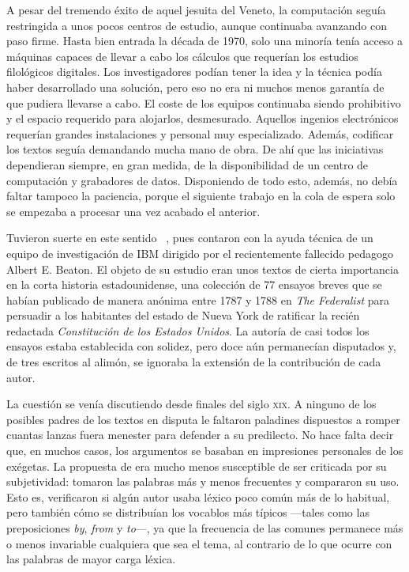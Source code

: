 A pesar del tremendo éxito de aquel jesuita del Veneto, la computación seguía restringida a unos pocos centros de estudio, aunque continuaba avanzando con paso firme. Hasta bien entrada la década de 1970, solo una minoría tenía acceso a máquinas capaces de llevar a cabo los cálculos que requerían los estudios filológicos digitales. Los investigadores podían tener la idea y la técnica podía haber desarrollado una solución, pero eso no era ni muchos menos garantía de que pudiera llevarse a cabo. El coste de los equipos continuaba siendo prohibitivo y el espacio requerido para alojarlos, desmesurado. Aquellos ingenios electrónicos requerían grandes instalaciones y personal muy especializado. Además, codificar los textos seguía demandando mucha mano de obra. De ahí que las iniciativas dependieran siempre, en gran medida, de la disponibilidad de un centro de computación y grabadores de datos. Disponiendo de todo esto, además, no debía faltar tampoco la paciencia, porque el siguiente trabajo en la cola de espera solo se empezaba a procesar una vez acabado el anterior. 

Tuvieron suerte en este sentido \citeauthor{mosteller1963}~\parencite*{mosteller1963}, pues contaron con  la ayuda técnica de un equipo de investigación de IBM dirigido por el recientemente fallecido pedagogo Albert E. Beaton. El objeto de su estudio eran unos textos de cierta importancia en la corta historia estadounidense, una colección de 77 ensayos breves que se habían publicado de manera anónima entre 1787 y 1788 en \textit{The Federalist} para persuadir a los habitantes del estado de Nueva York de ratificar la recién redactada \textit{Constitución de los Estados Unidos}. La autoría de casi todos los ensayos estaba establecida con solidez, pero doce aún permanecían disputados y, de tres escritos al alimón, se ignoraba la extensión de la contribución de cada autor.

La cuestión se venía discutiendo desde finales del siglo \textsc{xix}. A ninguno de los posibles padres de los textos en disputa le faltaron paladines dispuestos a romper cuantas lanzas fuera menester para defender a su predilecto. No hace falta decir que, en muchos casos, los argumentos se basaban en impresiones personales de los exégetas. La propuesta de \citeauthor{mosteller1963} era mucho menos susceptible de ser criticada por su subjetividad: tomaron las palabras más y menos frecuentes y compararon su uso. Esto es, verificaron si algún autor usaba léxico poco común más de lo habitual, pero también cómo se distribuían los vocablos más típicos  —tales como las preposiciones \textit{by}, \textit{from} y \textit{to}—, ya que la frecuencia de las comunes permanece más o menos invariable cualquiera que sea el tema, al contrario de lo que ocurre con las palabras de mayor carga léxica.

